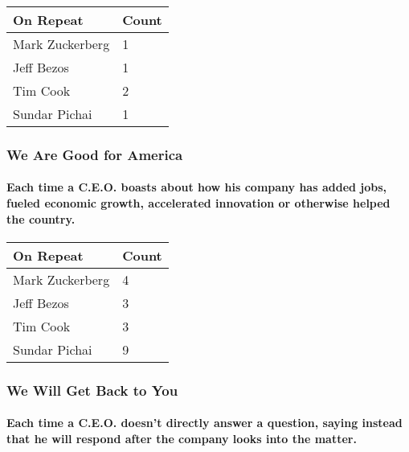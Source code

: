 \begin{longtable}[]{@{}ll@{}}
\toprule
\textbf{On Repeat} & \textbf{Count}\tabularnewline
\midrule
\endhead
Mark Zuckerberg & 1\tabularnewline
Jeff Bezos & 1\tabularnewline
Tim Cook & 2\tabularnewline
Sundar Pichai & 1\tabularnewline
\bottomrule
\end{longtable}

\hypertarget{we-are-good-for-america}{%
\subsubsection{We Are Good for America}\label{we-are-good-for-america}}

\hypertarget{each-time-a-ceo-boasts-about-how-his-company-has-added-jobs-fueled-economic-growth-accelerated-innovation-or-otherwise-helped-the-country}{%
\paragraph{Each time a C.E.O. boasts about how his company has added
jobs, fueled economic growth, accelerated innovation or otherwise helped
the
country.}\label{each-time-a-ceo-boasts-about-how-his-company-has-added-jobs-fueled-economic-growth-accelerated-innovation-or-otherwise-helped-the-country}}

\begin{longtable}[]{@{}ll@{}}
\toprule
\textbf{On Repeat} & \textbf{Count}\tabularnewline
\midrule
\endhead
Mark Zuckerberg & 4\tabularnewline
Jeff Bezos & 3\tabularnewline
Tim Cook & 3\tabularnewline
Sundar Pichai & 9\tabularnewline
\bottomrule
\end{longtable}

\hypertarget{we-will-get-back-to-you}{%
\subsubsection{We Will Get Back to You}\label{we-will-get-back-to-you}}

\hypertarget{each-time-a-ceo-doesnt-directly-answer-a-question-saying-instead-that-he-will-respond-after-the-company-looks-into-the-matter}{%
\paragraph{Each time a C.E.O. doesn't directly answer a question, saying
instead that he will respond after the company looks into the
matter.}\label{each-time-a-ceo-doesnt-directly-answer-a-question-saying-instead-that-he-will-respond-after-the-company-looks-into-the-matter}}

